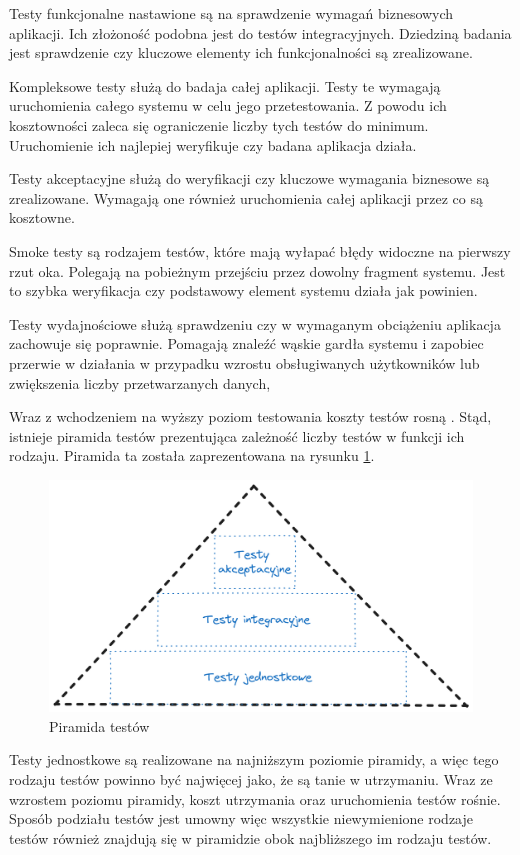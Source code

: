 Testy funkcjonalne nastawione są na sprawdzenie wymagań biznesowych aplikacji.
Ich złożoność podobna jest do testów integracyjnych.
Dziedziną badania jest sprawdzenie czy kluczowe elementy ich funkcjonalności są zrealizowane.

Kompleksowe testy służą do badaja całej aplikacji.
Testy te wymagają uruchomienia całego systemu w celu jego przetestowania.
Z powodu ich kosztowności zaleca się ograniczenie liczby tych testów do minimum.
Uruchomienie ich najlepiej weryfikuje czy badana aplikacja działa.

Testy akceptacyjne służą do weryfikacji czy kluczowe wymagania biznesowe są zrealizowane.
Wymagają one również uruchomienia całej aplikacji przez co są kosztowne.

Smoke testy są rodzajem testów, które mają wyłapać błędy widoczne na pierwszy rzut oka.
Polegają na pobieżnym przejściu przez dowolny fragment systemu.
Jest to szybka weryfikacja czy podstawowy element systemu działa jak powinien.

Testy wydajnościowe służą sprawdzeniu czy w wymaganym obciążeniu aplikacja zachowuje się poprawnie.
Pomagają znaleźć wąskie gardła systemu i zapobiec przerwie w działania w przypadku wzrostu obsługiwanych użytkowników lub zwiększenia liczby przetwarzanych danych,

Wraz z wchodzeniem na wyższy poziom testowania koszty testów rosną \cite{testerzyPiramidaTestw}.
Stąd, istnieje piramida testów prezentująca zależność liczby testów w funkcji ich rodzaju.
Piramida ta została zaprezentowana na rysunku \ref{rys:test-pyramid}.
\begin{figure}[!hb]
	\centering \includegraphics[width=1\linewidth]{rysunki/test-pyramid.png}
	\caption{Piramida testów}
	\label{rys:test-pyramid}
\end{figure}
Testy jednostkowe są realizowane na najniższym poziomie piramidy, a więc tego rodzaju testów powinno być najwięcej jako, że są tanie w utrzymaniu.
Wraz ze wzrostem poziomu piramidy, koszt utrzymania oraz uruchomienia testów rośnie.
Sposób podziału testów jest umowny więc wszystkie niewymienione rodzaje testów również znajdują się w piramidzie obok najbliższego im rodzaju testów.



